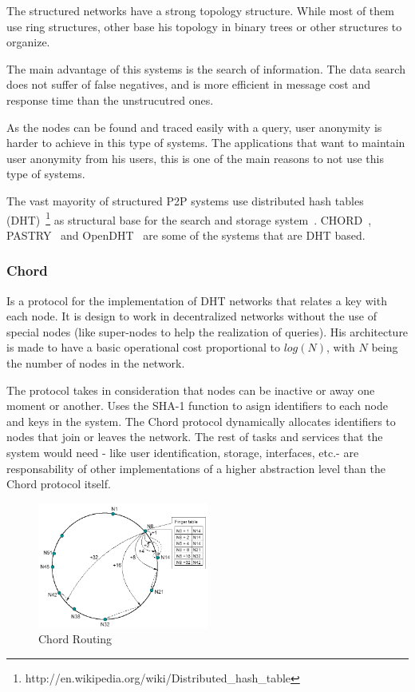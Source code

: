 The structured networks have a strong topology structure. While most of them
use ring structures, other base his topology in binary trees or other
structures to organize.

The main advantage of this systems is the search of information. The data search does not
suffer of false negatives, and is more efficient in message cost and response
time than the unstrucutred ones. 

As the nodes can be found and traced easily with a query, user anonymity is harder to
achieve in this type of systems.  The applications that want to maintain user
anonymity from his users, this is one of the main reasons to not use this type
of systems.

The vast mayority of structured P2P systems use distributed hash tables
(DHT)~\footnote{http://en.wikipedia.org/wiki/Distributed\_hash\_table} as
structural base for the search and storage system~\cite{BalakrishnanEtAl03}.
CHORD~\cite{conf:hotos:DabekBKKMSB01},
PASTRY~\cite{oai:CiteSeerPSU:441779} and 
OpenDHT~\cite{Rhea:2005:OPD:1080091.1080102}
are some of the systems that are DHT based.

\subsubsection{Chord}
\label{sec:chord}

Is a protocol for the implementation of DHT networks that relates a key with
each node. It is design to work in decentralized networks without the use of
special nodes (like super-nodes to help the realization of queries). His
architecture is made to have a basic operational cost proportional to $log(N)$,
with $N$ being the number of nodes in the network.

The protocol takes in consideration that nodes can be inactive or away one
moment or another. Uses the SHA-1 function to asign identifiers to each node
and keys in the system. The Chord protocol dynamically allocates identifiers to nodes that
join or leaves the network. The rest of tasks and services that the system
would need - like user identification, storage, interfaces, etc.- are
responsability of other implementations of a higher abstraction level than the
Chord protocol itself.

\label{sec:chord}
\begin{figure}
\center
\includegraphics[width=0.5\textwidth]{img/chord-search}
\caption{Chord Routing}
\label{fig:p2p_estructured_chord_search}
\end{figure}

